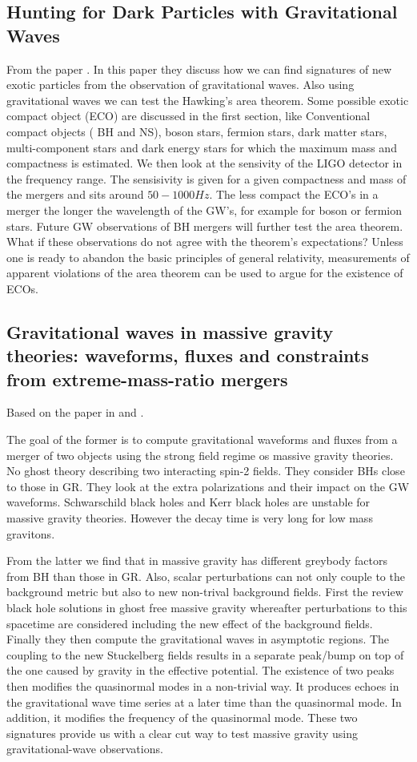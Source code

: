 \documentclass[12 pt]{article}
\begin{document}
	\subsection{Hunting for Dark Particles
		with Gravitational Waves}
	From the paper \cite{huntdark}.  In this paper they discuss how we can find signatures of new exotic particles from the observation of gravitational waves. Also using gravitational waves we can test the Hawking's area theorem. 
	Some possible exotic compact object (ECO) are discussed in the first section, like Conventional compact objects ( BH and NS), boson stars, fermion stars, dark matter stars, multi-component stars and dark energy stars for which the maximum mass and compactness is estimated. 
	We then look at the sensivity of the LIGO detector in the frequency range. The sensisivity is given for a given compactness and mass of the mergers and sits around $50-1000 Hz$. The less compact the ECO's in a merger the longer the wavelength of the GW's, for example for boson or fermion stars. Future GW observations of BH mergers will further test the area theorem. What if
	these observations do not agree with the theorem’s expectations? Unless one is ready to
	abandon the basic principles of general relativity, measurements of apparent violations of the
	area theorem can be used to argue for the existence of ECOs.
	
	\subsection{Gravitational waves in massive gravity theories:
		waveforms, fluxes and constraints from extreme-mass-ratio mergers}
	Based on the paper in \cite{GWMassG} and \cite{GWMassG2}. 
	
	The goal of the former is to compute gravitational waveforms and fluxes from a merger of two objects using the strong field regime os massive gravity theories. No ghost theory describing two interacting spin-2 fields. They consider BHs close to those in GR. They look at the extra polarizations and their impact on the GW waveforms. Schwarschild black holes and Kerr black holes are unstable for massive gravity theories. However the decay time is very long for low mass gravitons. 
	
	From the latter we find that in massive gravity has different greybody factors from BH than those in GR. Also, scalar perturbations can not only couple to the background metric but also to new  non-trival background fields. First the review black hole solutions in ghost free massive gravity whereafter perturbations to this spacetime are considered including the new effect of the background fields. Finally they then compute the gravitational waves in asymptotic regions. The coupling to the new Stuckelberg fields results in a separate peak/bump on top of the one caused by gravity in
	the effective potential. The existence of two peaks then modifies the quasinormal modes in a non-trivial way. It produces echoes in the gravitational wave time series at a later time than the quasinormal mode. In addition, it modifies the frequency of the quasinormal mode. These two signatures provide us with a clear cut way to test massive gravity using gravitational-wave observations.
	
\end{document}
